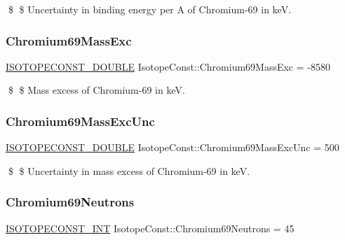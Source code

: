 \$ \$ Uncertainty in binding energy per A of Chromium-\/69 in keV. \mbox{\label{group___isotope_const-_chromium-_cr69_gae082d850c2fb63fce80f2ab3bdd67ee9}} 
\subsubsection{\texorpdfstring{Chromium69\+Mass\+Exc}{Chromium69MassExc}}
{\footnotesize\ttfamily \mbox{\hyperlink{group___isotope_const-_macros_ga8f45a7272ce02c0b4c65c44636ed719a}{I\+S\+O\+T\+O\+P\+E\+C\+O\+N\+S\+T\+\_\+\+D\+O\+U\+B\+LE}} Isotope\+Const\+::\+Chromium69\+Mass\+Exc = -\/8580}

\$ \$ Mass excess of Chromium-\/69 in keV. \mbox{\label{group___isotope_const-_chromium-_cr69_ga1fe0856076c6db074283e820964d0bbf}} 
\subsubsection{\texorpdfstring{Chromium69\+Mass\+Exc\+Unc}{Chromium69MassExcUnc}}
{\footnotesize\ttfamily \mbox{\hyperlink{group___isotope_const-_macros_ga8f45a7272ce02c0b4c65c44636ed719a}{I\+S\+O\+T\+O\+P\+E\+C\+O\+N\+S\+T\+\_\+\+D\+O\+U\+B\+LE}} Isotope\+Const\+::\+Chromium69\+Mass\+Exc\+Unc = 500}

\$ \$ Uncertainty in mass excess of Chromium-\/69 in keV. \mbox{\label{group___isotope_const-_chromium-_cr69_gad4dddf0b8c11c06e57a21baed8fdcba3}} 
\subsubsection{\texorpdfstring{Chromium69\+Neutrons}{Chromium69Neutrons}}
{\footnotesize\ttfamily \mbox{\hyperlink{group___isotope_const-_macros_ga5f18360b3e99483a35c32d789e62621c}{I\+S\+O\+T\+O\+P\+E\+C\+O\+N\+S\+T\+\_\+\+I\+NT}} Isotope\+Const\+::\+Chromium69\+Neutrons = 45}

